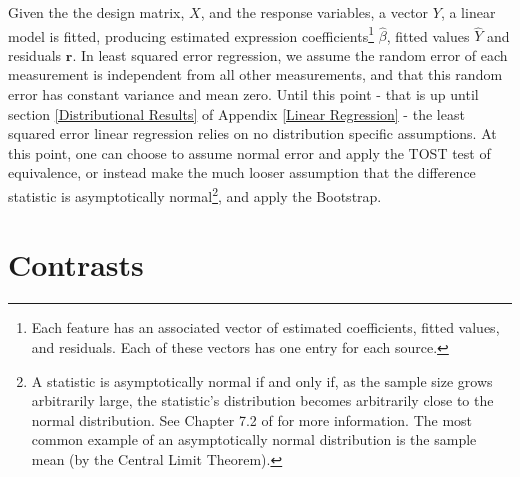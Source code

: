  Given the the design matrix, $X$, and the response variables, a vector $Y$, a linear model is fitted, producing estimated expression coefficients\footnote{Each feature has an associated vector of estimated coefficients, fitted values, and residuals. Each of these vectors has one entry for each source.} $\hat{\beta}$, fitted values $\hat{Y}$ and residuals $\mathbf{r}$. In least squared error regression, we assume the random error of each measurement is independent from all other measurements, and that this random error has constant variance and mean zero.  Until this point - that is up until section \ref{Distributional Results} of Appendix \ref{Linear Regression} - the least squared error linear regression relies on no distribution specific assumptions. At this point, one can choose to assume normal error and apply the TOST test of equivalence, or instead make the much looser assumption that the difference statistic is asymptotically normal\footnote{A statistic is asymptotically normal if and only if, as the sample size grows arbitrarily large, the statistic's distribution becomes arbitrarily close to the normal distribution. See Chapter 7.2 of \cite{Intro} for more information. The most common example of an asymptotically normal distribution is the sample mean (by the Central Limit Theorem).}, and apply the Bootstrap.


\section{ Contrasts }


